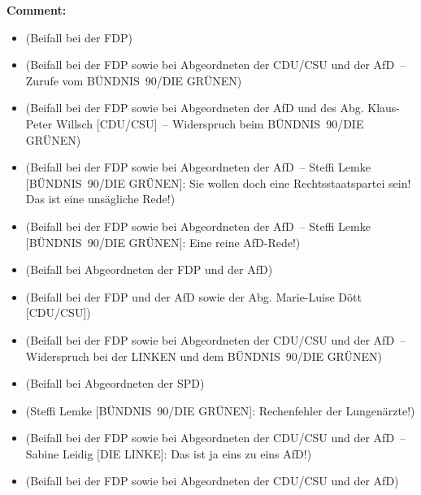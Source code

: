 \documentclass{article}
\begin{document}
\noindent\textbf{Comment:}
\begin{itemize}
    \setlength\itemsep{-3pt}
    \item (Beifall bei der FDP)
    \setlength\itemsep{-3pt}
    \item (Beifall bei der FDP sowie bei Abgeordneten der CDU/CSU und der AfD – Zurufe vom BÜNDNIS 90/DIE GRÜNEN)
    \setlength\itemsep{-3pt}
    \item (Beifall bei der FDP sowie bei Abgeordneten der AfD und des Abg. Klaus-Peter Willsch [CDU/CSU] – Widerspruch beim BÜNDNIS 90/DIE GRÜNEN)
    \setlength\itemsep{-3pt}
    \item (Beifall bei der FDP sowie bei Abgeordneten der AfD – Steffi Lemke [BÜNDNIS 90/DIE GRÜNEN]: Sie wollen doch eine Rechtsstaats­partei sein! Das ist eine unsägliche Rede!)
    \setlength\itemsep{-3pt}
    \item (Beifall bei der FDP sowie bei Abgeordneten der AfD – Steffi Lemke [BÜNDNIS 90/DIE GRÜNEN]: Eine reine AfD-Rede!)
    \setlength\itemsep{-3pt}
    \item (Beifall bei Abgeordneten der FDP und der AfD)
    \setlength\itemsep{-3pt}
    \item (Beifall bei der FDP und der AfD sowie der Abg. Marie-Luise Dött [CDU/CSU])
    \setlength\itemsep{-3pt}
    \item (Beifall bei der FDP sowie bei Abgeordneten der CDU/CSU und der AfD – Widerspruch bei der LINKEN und dem BÜNDNIS 90/DIE GRÜNEN)
    \setlength\itemsep{-3pt}
    \item (Beifall bei Abgeordneten der SPD)
    \setlength\itemsep{-3pt}
    \item (Steffi Lemke [BÜNDNIS 90/DIE GRÜNEN]: Rechenfehler der Lungenärzte!)
    \setlength\itemsep{-3pt}
    \item (Beifall bei der FDP sowie bei Abgeordneten der CDU/CSU und der AfD – Sabine Leidig [DIE LINKE]: Das ist ja eins zu eins AfD!)
    \setlength\itemsep{-3pt}
    \item (Beifall bei der FDP sowie bei Abgeordneten der CDU/CSU und der AfD)
\end{itemize}
\end{document}
